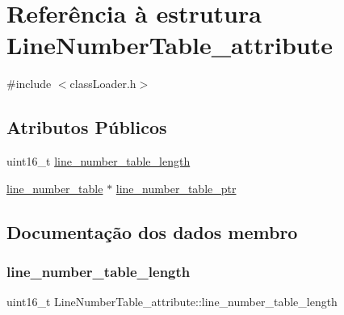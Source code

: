 \hypertarget{struct_line_number_table__attribute}{}\section{Referência à estrutura Line\+Number\+Table\+\_\+attribute}
\label{struct_line_number_table__attribute}


{\ttfamily \#include $<$class\+Loader.\+h$>$}

\subsection*{Atributos Públicos}
\begin{DoxyCompactItemize}
\item 
uint16\+\_\+t \hyperlink{struct_line_number_table__attribute_a4c3122c674349b8b5c0a8899e0e40a05}{line\+\_\+number\+\_\+table\+\_\+length}
\item 
\hyperlink{structline__number__table}{line\+\_\+number\+\_\+table} $\ast$ \hyperlink{struct_line_number_table__attribute_ac194cc6f527052717c72a7964d57871e}{line\+\_\+number\+\_\+table\+\_\+ptr}
\end{DoxyCompactItemize}


\subsection{Documentação dos dados membro}
\hypertarget{struct_line_number_table__attribute_a4c3122c674349b8b5c0a8899e0e40a05}{}\label{struct_line_number_table__attribute_a4c3122c674349b8b5c0a8899e0e40a05} 
\subsubsection{\texorpdfstring{line\+\_\+number\+\_\+table\+\_\+length}{line\_number\_table\_length}}
{\footnotesize\ttfamily uint16\+\_\+t Line\+Number\+Table\+\_\+attribute\+::line\+\_\+number\+\_\+table\+\_\+length}

\hypertarget{struct_line_number_table__attribute_ac194cc6f527052717c72a7964d57871e}{}\label{struct_line_number_table__attribute_ac194cc6f527052717c72a7964d57871e} 
